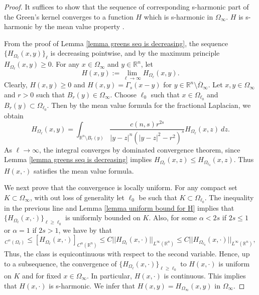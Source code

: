 \documentclass{amsart}
\newcommand{\R}{\mathbb{R}}
\newcommand{\rn}{\mathbb{R}^{n}}
\begin{document}
\begin{proof}
 It suffices to show that the sequence of corresponding s-harmonic part of the Green's kernel converges to a function $H$ which is s-harmonic in $\Omega_\infty$. $H$ is s-harmonic by the mean value property \cite[Proposition 2.2]{Silvestre2007}. 
\smallskip
 
From the proof of Lemma \ref{lemma greens seq is decreasing}, the sequence $\{H_{\Omega_{\ell}}(x,y)\}_{\ell}$ is decreasing pointwise, and by the maximum principle $H_{\Omega_{\ell}}(x,y)\geq 0$. For any $x\in \Omega_{\infty}$ and $y\in \rn$, let 
    \begin{equation*}
        H(x,y):=\lim_{\ell\to\infty}H_{\Omega_{\ell}}(x,y).
    \end{equation*}
    Clearly,  $H(x,y)\geq 0$ and $H(x,y)=\Gamma_{s}(x-y)$ for $y\in \R^{n}\setminus\overline{\Omega}_{\infty}$. Let $x,y\in \Omega_{\infty}$ and $r>0$ such that $B_{r}(y)\in\Omega_{\infty}$. Choose $\ell_{0}$ such that $x\in \Omega_{\ell_{0}}$ and $B_{r}(y)\subset \Omega_{\ell_{0}}$. Then by the mean value formula for the fractional Laplacian, we obtain
    \begin{equation*}
        H_{\Omega_{\ell}}(x,y)=\int_{\R^{n}\setminus B_{r}(y)}\frac{c(n,s)r^{2s}}{|y-z|^{n}\left(|y-z|^{2}-r^{2}\right)^{s}}H_{\Omega_{\ell}}(x,z)\ dz.
    \end{equation*}
    As $\ell\to\infty$, the integral converges by dominated convergence theorem, since Lemma \ref{lemma greens seq is decreasing} implies $H_{\Omega_{\ell}}(x,z)\leq H_{\Omega_{\ell_{0}}}(x,z)$. Thus $H(x,\cdot)$ satisfies the mean value formula. 
    \smallskip 

     We next prove that the convergence is locally uniform.
    For any compact set $K\subset \Omega_{\infty}$, with out loss of generality let $\ell_{0}$ be such that $K\subset \Omega_{\ell_{0}}$. The inequality in the previous line and Lemma \ref{lemma uniform bound for H} implies that $\{H_{\Omega_{\ell}}(x,\cdot)\}_{\ell\geq \ell_{0}}$ is uniformly bounded on $K$. Also, for some $\alpha<2s$ if $2s\leq 1$ or $\alpha=1$ if $2s>1$, we have by \cite[Proposition 2.9]{Silvestre2007} that
    \begin{equation*}
       [H_{\Omega_{\ell}}(x,\cdot)]_{C^{\alpha}(\Omega_{\ell})}\leq [H_{\Omega_{\ell}}(x,\cdot)]_{C^{\alpha}(\rn)}\leq C ||H_{\Omega_{\ell}}(x,\cdot)||_{L^{\infty}(\rn)}\leq C ||H_{\Omega_{\ell_{0}}}(x,\cdot)||_{L^{\infty}(\rn)},
    \end{equation*}
Thus, the class is equicontinuous with respect to the second variable. Hence, up to a subsequence, the convergence of $\{H_{\Omega_{\ell}}(x,\cdot)\}_{\ell\geq \ell_{0}}$ to $H(x,\cdot)$ is uniform on $K$ and for fixed $x\in \Omega_{\infty}$. In particular, $H(x,\cdot)$ is continuous. This implies that $H(x,\cdot)$ is s-harmonic.  We infer that $H(x,y)=H_{\Omega_{\infty}}(x,y)$ in $\Omega_{\infty}$. 
    \end{proof}
\end{document}
